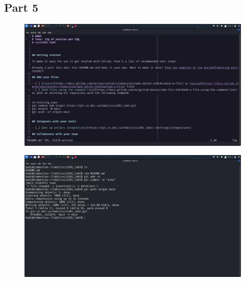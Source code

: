 \documentclass{article}
\numberwithin{equation}{subsection}
\begin{document}
	\subsection{Part 5}
	\begin{figure}[H]
		\includegraphics[width=430pt]{pics/Screenshot_2025-03-07_12_32_18.png}
	\end{figure}
	\begin{figure}[H]
		\includegraphics[width=430pt]{pics/Screenshot_2025-03-07_12_32_48.png}
	\end{figure}






	
\end{document}
